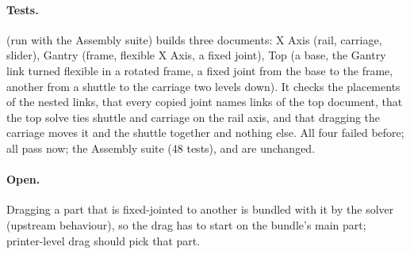 \paragraph{Tests.}  (run with the Assembly suite) builds three
documents: X Axis (rail, carriage, slider), Gantry (frame, flexible X Axis, a fixed joint), Top (a base, the
Gantry link turned flexible in a rotated frame, a fixed joint from the base to the frame, another from a shuttle to
the carriage two levels down). It checks the placements of the nested links, that every copied joint names links of
the top document, that the top solve ties shuttle and carriage on the rail axis, and that dragging the carriage
moves it and the shuttle together and nothing else. All four failed before; all pass now; the Assembly suite
(48 tests),  and  are unchanged.

\paragraph{Open.} Dragging a part that is fixed-jointed to another is bundled with it by the solver (upstream
behaviour), so the drag has to start on the bundle's main part; printer-level drag should pick that part.
